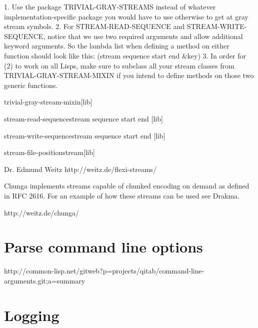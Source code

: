 \documentclass[10pt,english]{book}
\begin{document}
1. Use the package TRIVIAL-GRAY-STREAMS instead of whatever
   implementation-specific package you would have to use otherwise to
   get at gray stream symbols.
2. For STREAM-READ-SEQUENCE and STREAM-WRITE-SEQUENCE, notice that we
   use two required arguments and allow additional keyword arguments.
   So the lambda list when defining a method on either function should look
   like this:
     (stream sequence start end \&key)
3. In order for (2) to work on all Lisps, make sure to subclass all your
   stream classes from TRIVIAL-GRAY-STREAM-MIXIN if you intend to define
   methods on those two generic functions.

\begin{class}{trivial-gray-stream-mixin}{}[lib]
          
\end{class}

\begin{function}{stream-read-sequence}{stream sequence start end \key}[lib]
  
\end{function}

\begin{function}{stream-write-sequence}{stream sequence start end \key}[lib]
  
\end{function}

\begin{function}{stream-file-position}{stream}[lib]
  
\end{function}


Dr. Edmund Weitz
http://weitz.de/flexi-streams/

Chunga implements streams capable of chunked encoding on demand as
defined in RFC 2616. For an example of how these streams can be used
see Drakma. 

http://weitz.de/chunga/

\section{Parse command line options}
\label{sec:parse-command-line}

http://common-lisp.net/gitweb?p=projects/qitab/command-line-arguments.git;a=summary

\section{Logging}
\label{sec:logging}
\end{document}
